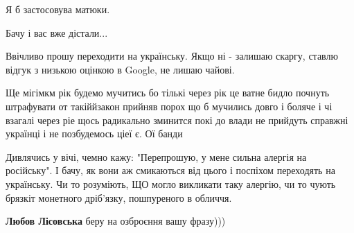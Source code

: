 \begin{itemize}
Я б застосовува матюки.

 
Бачу і вас вже дістали...

 
Ввічливо прошу переходити на українську. Якщо ні - залишаю скаргу, ставлю
відгук з низькою оцінкою в Google, не лишаю чайові.

 

Ще мігімкм рік будемо мучитись бо тількі через рік це ватне бидло почнуть
штрафувати от такіййзакон прийняв порох що б мучились довго і боляче і чі
взагалі через ріе щось радикально зминится покі до влади не прийдуть справжні
українці і не позбудемось ціеї є. Ої банди

 

Дивлячись у вічі, чемно кажу: "Перепрошую, у мене сильна алергія на російську".
І бачу, як вони аж смикаються від цього і поспіхом переходять на українську. Чи
то розуміють, ЩО могло викликати таку алергію, чи то чують брязкіт монетного
дріб'язку, пошпуреного в обличчя.

\begin{itemize}
 
\textbf{Любов Лісовська} беру на озброєння вашу фразу)))
\end{itemize}


\end{itemize}
